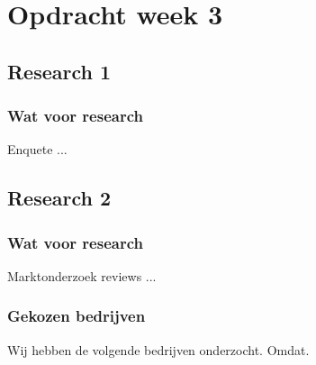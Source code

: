 \chapter{Opdracht week 3}

\section{Research 1}

\subsection{Wat voor research}

Enquete ...

\section{Research 2}

\subsection{Wat voor research}

Marktonderzoek reviews ...

\subsection{Gekozen bedrijven}

Wij hebben de volgende bedrijven onderzocht. Omdat.


